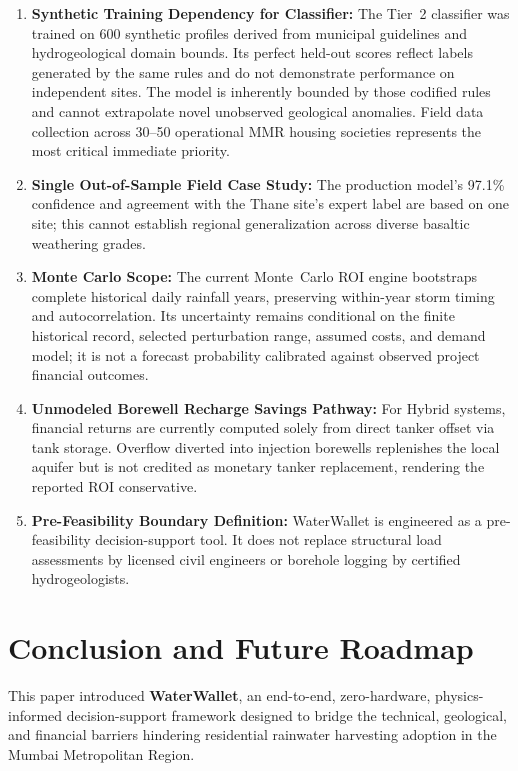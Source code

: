 ﻿\documentclass[conference]{IEEEtran}
\begin{document}
\begin{enumerate}
  \item \textbf{Synthetic Training Dependency for Classifier:} The Tier~2 classifier was trained on 600 synthetic profiles derived from municipal guidelines and hydrogeological domain bounds. Its perfect held-out scores reflect labels generated by the same rules and do not demonstrate performance on independent sites. The model is inherently bounded by those codified rules and cannot extrapolate novel unobserved geological anomalies. Field data collection across 30--50 operational MMR housing societies represents the most critical immediate priority.
  
  \item \textbf{Single Out-of-Sample Field Case Study:} The production model's 97.1\% confidence and agreement with the Thane site's expert label are based on one site; this cannot establish regional generalization across diverse basaltic weathering grades.
  
  \item \textbf{Monte Carlo Scope:} The current Monte~Carlo ROI engine bootstraps complete historical daily rainfall years, preserving within-year storm timing and autocorrelation. Its uncertainty remains conditional on the finite historical record, selected perturbation range, assumed costs, and demand model; it is not a forecast probability calibrated against observed project financial outcomes.
  
  \item \textbf{Unmodeled Borewell Recharge Savings Pathway:} For Hybrid systems, financial returns are currently computed solely from direct tanker offset via tank storage. Overflow diverted into injection borewells replenishes the local aquifer but is not credited as monetary tanker replacement, rendering the reported ROI conservative.
  
  \item \textbf{Pre-Feasibility Boundary Definition:} WaterWallet is engineered as a pre-feasibility decision-support tool. It does not replace structural load assessments by licensed civil engineers or borehole logging by certified hydrogeologists.
\end{enumerate}

\section{Conclusion and Future Roadmap}
\label{sec:conclusion}

This paper introduced \textbf{WaterWallet}, an end-to-end, zero-hardware, physics-informed decision-support framework designed to bridge the technical, geological, and financial barriers hindering residential rainwater harvesting adoption in the Mumbai Metropolitan Region. 
\end{document}
